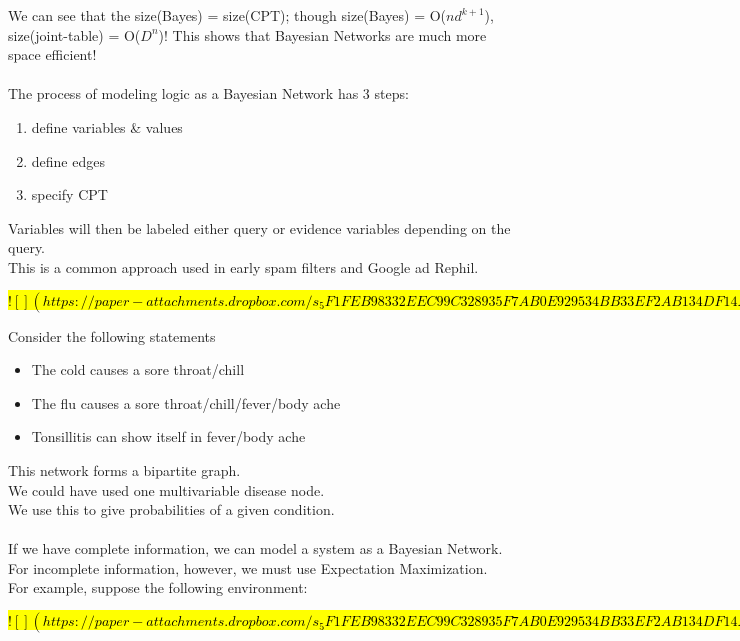\documentclass[../../lecture_notes.tex]{subfiles}
\begin{document}
\noindent We can see that the size(Bayes) = size(CPT);
	though size(Bayes) = O($nd^{k+1}$), size(joint-table) = O($D^n$)!
This shows that Bayesian Networks are much more space efficient!\\
\\
The process of modeling logic as a Bayesian Network has 3 steps:
\begin{enumerate} [itemsep=0mm]
	\item define variables \& values
	\item define edges
	\item specify CPT
\end{enumerate} 

\noindent Variables will then be labeled either query or evidence variables depending on the query.\\
This is a common approach used in early spam filters and Google ad Rephil.

\hl{
$![](https://paper-attachments.dropbox.com/s_5F1FEB98332EEC99C328935F7AB0E929534BB33EF2AB134DF14A85072ADC65A0_1590256640289_Untitled+drawing+8.jpg)$
}

\noindent Consider the following statements
\begin{itemize} [itemsep=0mm]
	\item The cold causes a sore throat/chill
	\item The flu causes a sore throat/chill/fever/body ache
	\item Tonsillitis can show itself in fever/body ache
\end{itemize}
\noindent This network forms a bipartite graph.\\
We could have used one multivariable disease node.\\
We use this to give probabilities of a given condition.\\
\\
If we have complete information, we can model a system as a Bayesian Network.\\
For incomplete information, however, we must use Expectation Maximization.\\
For example, suppose the following environment:

\hl{
$![](https://paper-attachments.dropbox.com/s_5F1FEB98332EEC99C328935F7AB0E929534BB33EF2AB134DF14A85072ADC65A0_1590257642435_Untitled+drawing+9.jpg)$
}
\end{document}
